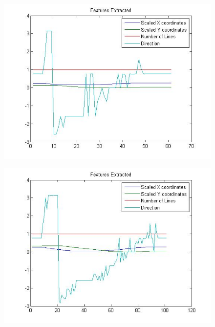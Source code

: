 \begin{figure}[H]
	\centering
	\begin{minipage}{.33\textwidth}
		\centering
		\includegraphics[width=.99\linewidth]{images/deepas/c_big}
		\label{fig:cs1}
	\end{minipage}%
	\begin{minipage}{.33\textwidth}
		\centering
		\includegraphics[width=.99\linewidth]{images/deepas/c_small}
		\label{fig:cs2}
	\end{minipage}
	\begin{minipage}{.33\textwidth}
		\centering

\end{minipage}
\end{figure}

